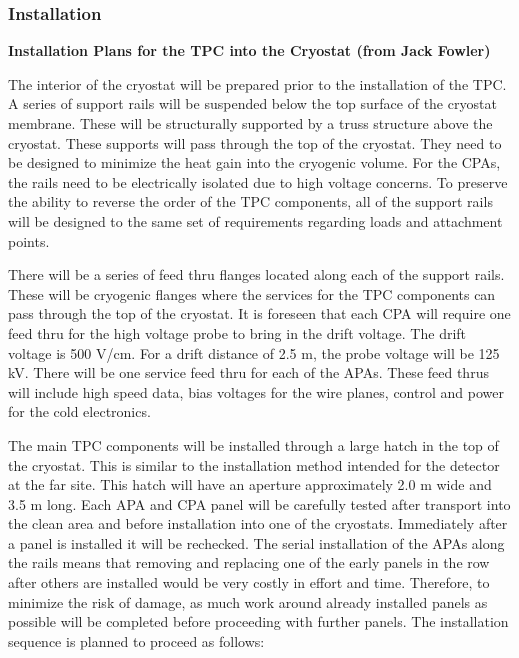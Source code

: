 \subsubsection{Installation}

\textbf{Installation Plans for the TPC into the Cryostat  (from Jack Fowler)}

The interior of the cryostat will be prepared prior to the installation of the TPC.  A series of support rails 
will be suspended below the top surface of the cryostat membrane.  These will be structurally supported 
by a truss structure above the cryostat.  These supports will pass through the top of the cryostat.  They 
need to be designed to minimize the heat gain into the cryogenic volume.  For the CPAs, the rails need to 
be electrically isolated due to high voltage concerns.  To preserve the ability to reverse the order of the 
TPC components, all of the support rails will be designed to the same set of requirements regarding 
loads and attachment points.  

There will be a series of feed thru flanges located along each of the support rails.  These will be cryogenic 
flanges where the services for the TPC components can pass through the top of the cryostat.  It is 
foreseen that each CPA will require one feed thru for the high voltage probe to bring in the drift voltage.  
The drift voltage is 500 V/cm.  For a drift distance of 2.5 m, the probe voltage will be 125 kV.  There will 
be one service feed thru for each of the APAs.  These feed thrus will include high speed data, bias 
voltages for the wire planes, control and power for the cold electronics.  

The main TPC components will be installed through a large hatch in the top of the cryostat.  This is 
similar to the installation method intended for the detector at the far site.  This hatch will have an 
aperture approximately 2.0 m wide and 3.5 m long.  Each APA and CPA panel will be carefully tested after 
transport into the clean area and before installation into one of the cryostats. Immediately after a panel is 
installed it will be rechecked. The serial installation of the APAs along the rails means that removing and 
replacing one of the early panels in the row after others are installed would be very costly in effort and 
time. Therefore, to minimize the risk of damage, as much work around already installed panels as 
possible will be completed before proceeding with further panels.
The installation sequence is planned to proceed as follows:

